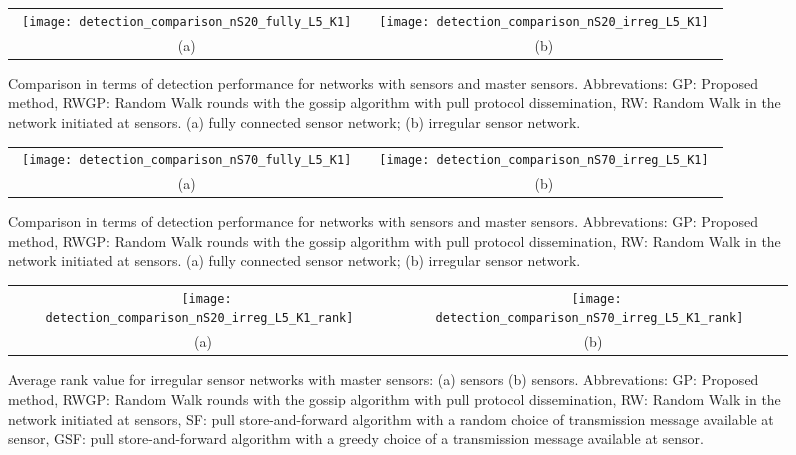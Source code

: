 \documentclass[journal]{IEEEtran}
\begin{document}
\begin{figure*}[htb]
\begin{center}
\begin{tabular}{cc}
~\texttt{[image: detection\_comparison\_nS20\_fully\_L5\_K1]}~&
~\texttt{[image: detection\_comparison\_nS20\_irreg\_L5\_K1]}~\\
~(a)~&~(b)~\\\end{tabular}
\end{center}
\caption{Comparison in terms of detection performance for networks with  sensors and  master sensors. Abbrevations: GP: Proposed method, RWGP: Random Walk rounds with the gossip algorithm with pull protocol dissemination, RW: Random Walk in the network initiated at  sensors. (a) fully connected sensor network; (b) irregular sensor network.}
\label{fig:20sens_dissemination}
\end{figure*}
\begin{figure*}[htb]
\begin{center}
\begin{tabular}{cc}
~\texttt{[image: detection\_comparison\_nS70\_fully\_L5\_K1]}~&
~\texttt{[image: detection\_comparison\_nS70\_irreg\_L5\_K1]}~\\
~(a)~&~(b)~\\\end{tabular}
\end{center}
\caption{Comparison in terms of detection performance for networks with  sensors and  master sensors. Abbrevations: GP: Proposed method, RWGP: Random Walk rounds with the gossip algorithm with pull protocol dissemination, RW: Random Walk in the network initiated at  sensors. (a) fully connected sensor network; (b) irregular sensor network.}
\label{fig:70sens_dissemination}
\end{figure*}


\begin{figure*}[htb]
\begin{center}
\begin{tabular}{cc}
~\texttt{[image: detection\_comparison\_nS20\_irreg\_L5\_K1\_rank]}~&
~\texttt{[image: detection\_comparison\_nS70\_irreg\_L5\_K1\_rank]}~\\
\hspace{-0.8cm}~(a)~&~(b)~\\\end{tabular}
\end{center}
\caption{Average rank value for irregular sensor networks with  master sensors: (a)  sensors (b)  sensors. Abbrevations: GP: Proposed method, RWGP: Random Walk rounds with the gossip algorithm with pull protocol dissemination, RW: Random Walk in the network initiated at  sensors, SF: pull store-and-forward algorithm with a random choice of transmission message available at sensor, GSF: pull store-and-forward algorithm with a greedy choice of a transmission message available at sensor.}
\label{fig:sens_dissemination_rank}
\end{figure*}
\end{document}
